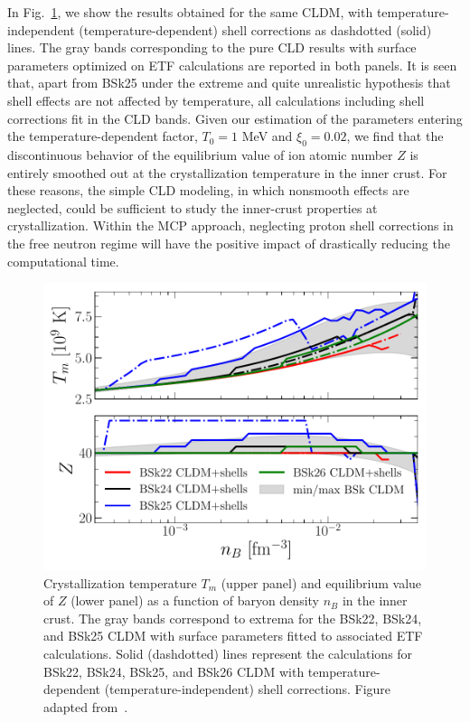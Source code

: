 In Fig.~\ref{fig:tm_compo_final2}, we show the results obtained for the same 
CLDM, with temperature-independent (temperature-dependent) shell corrections as 
dashdotted (solid) lines. The gray bands corresponding to the pure CLD results 
with surface parameters optimized on ETF calculations are reported in both
panels.
It is seen that, apart from BSk25 under the extreme and quite unrealistic
hypothesis that shell effects are not affected by temperature, all calculations
including shell corrections fit in the CLD bands. 
Given our estimation of the parameters entering the temperature-dependent
factor, $T_0=1$ MeV and $\xi_0 =0.02$, we find that the discontinuous behavior 
of the equilibrium value of ion atomic number $Z$ is entirely smoothed out at 
the crystallization temperature in the inner crust.
For these reasons, the simple CLD modeling, in which nonsmooth effects are
neglected, could be sufficient to study the inner-crust properties at 
crystallization.
Within the MCP approach, neglecting proton shell corrections in the free 
neutron regime will have the positive impact of drastically reducing the 
computational time.
%
\begin{figure}[!t]
  \begin{center}
    \includegraphics[width=0.9\linewidth]{figures/tm_compo_final2.pdf}
  \end{center}
  \caption[Crystallization temperature and equilibrium value of $Z$ of the
  one-component plasma versus baryon density in the inner crust]{
    Crystallization temperature $T_m$ (upper panel) and 
    equilibrium value of $Z$ (lower panel) as a function of baryon density 
    $n_B$ in the inner crust. The gray bands correspond to extrema for the 
    BSk22, BSk24, and BSk25 CLDM with surface parameters fitted to associated 
    ETF calculations. Solid (dashdotted) lines represent the calculations for 
    BSk22, BSk24, BSk25, and BSk26 CLDM with temperature-dependent 
    (temperature-independent) shell corrections. Figure adapted
    from~\cite{Carreau2019}.}\label{fig:tm_compo_final2}
\end{figure}

